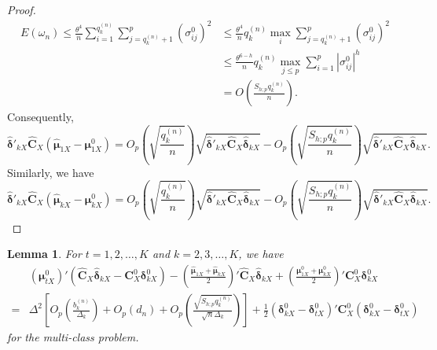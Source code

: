 \documentclass[12pt]{article}
\newtheorem{lemma}{Lemma}%
\begin{document}
\begin{proof}{}{}
\begin{align*}
E(\omega_n) \leq \frac{\theta^4}{n} \sum_{i=1}^{q_k^{(n)}} \sum_{j=q_k^{(n)} + 1}^{p} (\sigma_{ij}^0)^2
&\leq \frac{\theta^4}{n} q_k^{(n)} \max_{i} \sum_{j=q_k^{(n)} + 1}^{p} (\sigma_{ij}^0)^2 \\
&\leq \frac{\theta^{6-h}}{n} q_k^{(n)} \max_{j \leq p} \sum_{i=1}^{p} |\sigma_{ij}^0|^h \\
&= O(\frac{S_{h;p}q_k^{(n)}}{n}).
\end{align*}
Consequently,
\begin{equation*}
\hat{\bm \delta}'_{kX} \hat{\bm C}_X (\hat{\bm \mu}_{1X} - \bm \mu_{1X}^0)
= O_p(\sqrt{\frac{q_k^{(n)}}{n}}) \sqrt{\hat{\bm \delta}'_{kX} \hat{\bm C}_X \hat{\bm \delta}_{kX}} - O_p(\sqrt{\frac{S_{h;p} q_k^{(n)}}{n}}) \sqrt{\hat{\bm \delta}'_{kX} \hat{\bm C}_X \hat{\bm \delta}_{kX}}.
\end{equation*}
Similarly, we have
\begin{equation*}
\hat{\bm \delta}'_{kX} \hat{\bm C}_X (\hat{\bm \mu}_{kX} - \bm \mu_{kX}^0)
= O_p(\sqrt{\frac{q_k^{(n)}}{n}}) \sqrt{\hat{\bm \delta}'_{kX} \hat{\bm C}_X \hat{\bm \delta}_{kX}} - O_p(\sqrt{\frac{S_{h;p} q_k^{(n)}}{n}}) \sqrt{\hat{\bm \delta}'_{kX} \hat{\bm C}_X \hat{\bm \delta}_{kX}}.
\end{equation*}
\end{proof}




\begin{lemma}{}{\label{lemma4}}
For $t = 1, 2, \ldots, K$ and $k = 2, 3, \ldots, K$, we have
\begin{align*}
&(\bm \mu_{tX}^0)' (\hat{\bm C}_X \hat{\bm \delta}_{kX} - \bm C_X^0 \bm \delta_{kX}^0) - (\frac{\hat{\bm \mu}_{1X} + \hat{\bm \mu}_{kX}}{2})' \hat{\bm C}_X \hat{\bm \delta}_{kX} + (\frac{\bm \mu_{1X}^0 + \bm \mu_{kX}^0}{2})' \bm C_X^0 \bm \delta_{kX}^0 \\
=& \Delta^2 \left[ O_p(\frac{b_k^{(n)}}{\Delta_k}) + O_p(d_n) + O_p(\frac{\sqrt{S_{h;p} q_k^{(n)}}}{\sqrt{n} \Delta_k}) \right]  + \frac{1}{2} (\bm \delta_{kX}^0 - \bm \delta_{tX}^0)' \bm C_X^0 (\bm \delta_{kX}^0 - \bm \delta_{tX}^0)
\end{align*}
for the multi-class problem.
\end{lemma}
\end{document}

